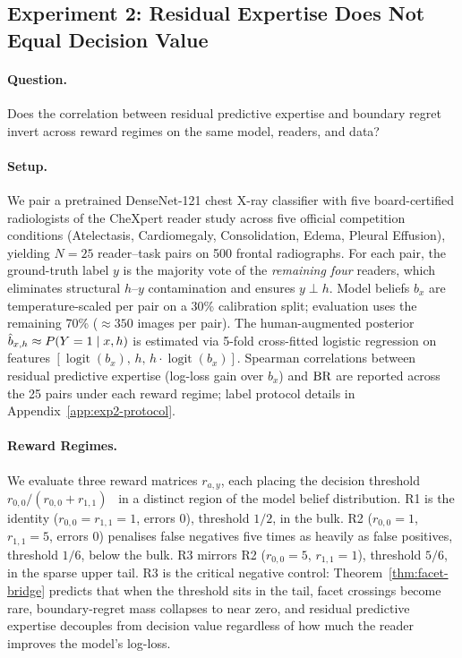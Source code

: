 
\subsection{Experiment 2: Residual Expertise Does Not Equal Decision Value}
\label{sec:exp2}

\paragraph{Question.}
Does the correlation between residual predictive expertise and boundary regret invert across reward regimes on the same model, readers, and data?

\paragraph{Setup.}
We pair a pretrained DenseNet-121 chest X-ray classifier \citep{Huang2017,Cohen2022} with five board-certified radiologists of the CheXpert reader study \citep{Irvin2019} across five official competition conditions (Atelectasis, Cardiomegaly, Consolidation, Edema, Pleural Effusion), yielding $N=25$ reader--task pairs on 500 frontal radiographs.
For each pair, the ground-truth label $y$ is the majority vote of the \emph{remaining four} readers, which eliminates structural $h$--$y$ contamination and ensures $y \perp h$.
Model beliefs $b_x$ are temperature-scaled \citep{GuoEtAl2017} per pair on a 30\% calibration split; evaluation uses the remaining 70\% (${\approx}350$ images per pair).
The human-augmented posterior $\hat{b}_{x,h} \approx P(Y=1 \mid x, h)$ is estimated via 5-fold cross-fitted logistic regression on features $[\operatorname{logit}(b_x),\, h,\, h \cdot \operatorname{logit}(b_x)]$.
Spearman correlations between residual predictive expertise (log-loss gain over $b_x$) and $\operatorname{BR}$ are reported across the 25 pairs under each reward regime; label protocol details in Appendix~\ref{app:exp2-protocol}.

\paragraph{Reward Regimes.}
We evaluate three reward matrices $r_{a,y}$, each placing the decision threshold $r_{0,0}/(r_{0,0}+r_{1,1})$~\citep{PaukerKassirer1980} in a distinct region of the model belief distribution.
R1 is the identity ($r_{0,0}=r_{1,1}=1$, errors $0$), threshold $1/2$, in the bulk.
R2 ($r_{0,0}=1$, $r_{1,1}=5$, errors $0$) penalises false negatives five times as heavily as false positives, threshold $1/6$, below the bulk.
R3 mirrors R2 ($r_{0,0}=5$, $r_{1,1}=1$), threshold $5/6$, in the sparse upper tail.
R3 is the critical negative control: Theorem~\ref{thm:facet-bridge} predicts that when the threshold sits in the tail, facet crossings become rare, boundary-regret mass collapses to near zero, and residual predictive expertise decouples from decision value regardless of how much the reader improves the model's log-loss.

